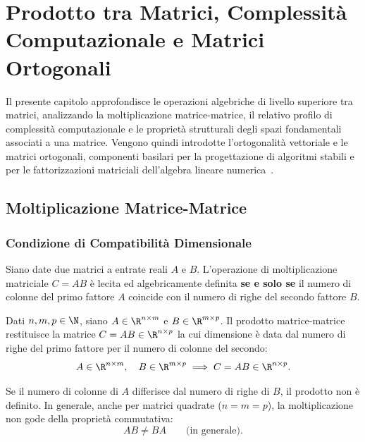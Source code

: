 \chapter{Prodotto tra Matrici, Complessit\`a Computazionale e Matrici Ortogonali}
\label{chap:prodotto-matrici-complessita-ortogonalita}

Il presente capitolo approfondisce le operazioni algebriche di livello superiore tra matrici, analizzando la moltiplicazione matrice-matrice, il relativo profilo di complessit\`a computazionale e le propriet\`a strutturali degli spazi fondamentali associati a una matrice. Vengono quindi introdotte l'ortogonalit\`a vettoriale e le matrici ortogonali, componenti basilari per la progettazione di algoritmi stabili e per le fattorizzazioni matriciali dell'algebra lineare numerica~\cite{trefethen1997numerical}.

\FloatBarrier
\section{Moltiplicazione Matrice-Matrice}

\subsection{Condizione di Compatibilit\`a Dimensionale}

Siano date due matrici a entrate reali $A$ e $B$. L'operazione di moltiplicazione matriciale $C = AB$ \`e lecita ed algebricamente definita \textbf{se e solo se} il numero di colonne del primo fattore $A$ coincide con il numero di righe del secondo fattore $B$.

\begin{definition}
Dati $n, m, p \in \N$, siano $A \in \R^{n \times m}$ e $B \in \R^{m \times p}$. Il prodotto matrice-matrice restituisce la matrice $C = AB \in \R^{n \times p}$ la cui dimensione \`e data dal numero di righe del primo fattore per il numero di colonne del secondo:
\begin{equation}
    A \in \R^{n \times m}, \quad B \in \R^{m \times p} \implies C = AB \in \R^{n \times p}.
\end{equation}
\end{definition}

Se il numero di colonne di $A$ differisce dal numero di righe di $B$, il prodotto non \`e definito. In generale, anche per matrici quadrate ($n = m = p$), la moltiplicazione non gode della propriet\`a commutativa:
\begin{equation}
    AB \neq BA \qquad \text{(in generale)}.
\end{equation}

